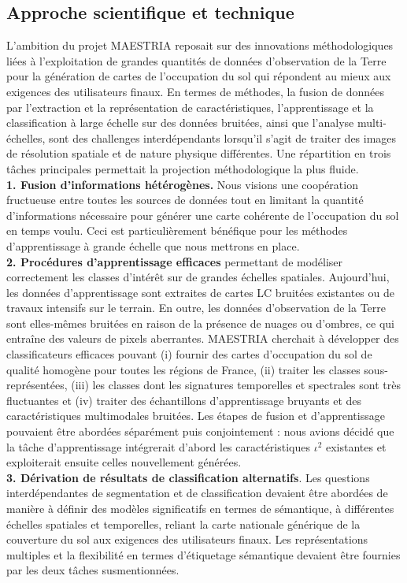 \subsection{Approche scientifique et technique}
\label{subsec:wp}
L'ambition du projet MAESTRIA reposait sur des innovations méthodologiques liées à l'exploitation de grandes quantités de données d'observation de la Terre pour la génération de cartes de l'occupation du sol qui répondent au mieux aux exigences des utilisateurs finaux.
En termes de méthodes, la fusion de données par l'extraction et la représentation de caractéristiques, l'apprentissage et la classification à large échelle sur des données bruitées, ainsi que l'analyse multi-échelles, sont des challenges interdépendants lorsqu'il s'agit de traiter des images de résolution spatiale et de nature physique différentes. Une répartition en trois tâches principales permettait la projection méthodologique la plus fluide.\\
\textbf{1. Fusion d'informations hétérogènes.} Nous visions une coopération fructueuse entre toutes les sources de données tout en limitant la quantité d'informations nécessaire pour générer une carte cohérente de l'occupation du sol en temps voulu. Ceci est particulièrement bénéfique
pour les méthodes d'apprentissage à grande échelle que nous mettrons en place.\\
\textbf{2. Procédures d'apprentissage efficaces} permettant de modéliser correctement les classes d'intérêt sur de grandes échelles spatiales. Aujourd'hui, les données d'apprentissage sont extraites de cartes LC bruitées existantes ou de travaux intensifs sur le terrain. En outre, les données d'observation de la Terre sont elles-mêmes bruitées en raison de la présence de nuages ou d'ombres, ce qui entraîne des valeurs de pixels aberrantes. MAESTRIA cherchait à développer des classificateurs efficaces
pouvant (i) fournir des cartes d'occupation du sol de qualité homogène pour toutes les régions de France, (ii) traiter les classes sous-représentées, (iii) les classes dont les signatures temporelles et spectrales sont très fluctuantes et (iv) traiter des échantillons d'apprentissage bruyants et des caractéristiques multimodales bruitées. Les étapes de fusion et d'apprentissage
pouvaient être abordées séparément puis conjointement : nous avions décidé  que la tâche d'apprentissage intégrerait d'abord les caractéristiques $\iota^2$ existantes et exploiterait ensuite celles nouvellement générées.\\
\textbf{3. Dérivation de résultats de classification alternatifs}. Les questions interdépendantes de segmentation et de classification devaient être abordées de manière à définir des modèles significatifs en termes de sémantique, à différentes échelles spatiales et temporelles, reliant la carte nationale générique de la couverture du sol aux exigences des utilisateurs finaux. Les représentations multiples et la flexibilité en termes d'étiquetage sémantique devaient être fournies par les deux tâches susmentionnées.\\

